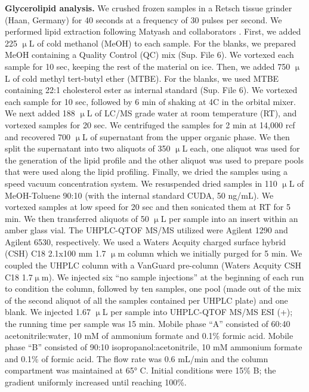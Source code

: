 \documentclass[9pt,twocolumn,twoside,lineno]{biorxiv}
\begin{document}
\textbf{Glycerolipid analysis.} 
We crushed frozen samples in a Retsch tissue grinder (Haan, Germany) for 40 seconds at a frequency of 30 pulses per second. 
We performed lipid extraction following Matyash and collaborators \cite{Matyash2008-ue}. 
First, we added 225 $\upmu$L of cold methanol (MeOH) to each sample. 
For the blanks, we prepared MeOH containing a Quality Control (QC) mix (Sup. File 6).
We vortexed each sample for 10 sec, keeping the rest of the material on ice. 
Then, we added 750 $\upmu$L of cold methyl tert-butyl ether (MTBE). 
For the blanks, we used MTBE containing 22:1 cholesterol ester as internal standard (Sup. File 6). 
We vortexed each sample for 10 sec, followed by 6 min of shaking at 4\degree C in the orbital mixer. 
We next added 188 $\upmu$L of LC/MS grade water at room temperature (RT), and vortexed samples for 20 sec.
We centrifuged the samples for 2 min at 14,000 rcf and recovered 700 $\upmu$L of supernatant from the upper organic phase. 
We then split the supernatant into two aliquots of 350 $\upmu$L each, one aliquot was used for the generation of the lipid profile and the other aliquot was used to prepare pools that were used along the lipid profiling. 
Finally, we dried the samples using a speed vacuum concentration system.
We resuspended dried samples in 110 $\upmu$L of MeOH-Toluene 90:10 (with the internal standard CUDA, 50 ng/mL). 
We vortexed samples at low speed for 20 sec and then sonicated them at RT for 5 min. 
We then transferred aliquots of 50 $\upmu$L per sample into an insert within an amber glass vial.
The UHPLC-QTOF MS/MS utilized were Agilent 1290 and Agilent 6530, respectively. 
We used a Waters Acquity charged surface hybrid (CSH) C18 2.1x100 mm 1.7 $\upmu$m column which we initially purged for 5 min. 
We coupled the UHPLC column with a VanGuard pre-column (Waters Acquity CSH C18 1.7$\upmu$m). 
We injected six “no sample injections” at the beginning of each run to condition the column, followed by ten samples, one pool (made out of the mix of the second aliquot of all the samples contained per UHPLC plate) and one blank.
We injected 1.67 $\upmu$L per sample into UHPLC-QTOF MS/MS ESI (+); the running time per sample was 15 min. 
Mobile phase “A” consisted of 60:40 acetonitrile:water, 10 mM of ammonium formate and 0.1\% formic acid. 
Mobile phase “B” consisted of 90:10 isopropanol:acetonitrile, 10 mM ammonium formate and 0.1\% of formic acid. 
The flow rate was 0.6 mL/min and the column compartment was maintained at 65° C. Initial conditions were 15\% B; the gradient uniformly increased until reaching 100\%. 
\end{document}
